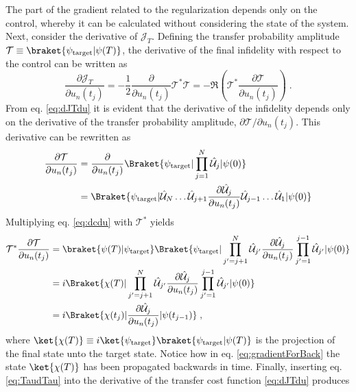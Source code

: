 The part of the gradient related to the regularization depends only on the control, whereby it can be calculated without considering the state of the system.\\ 
Next, consider the derivative of $\mathcal{J}_T$. Defining the transfer probability amplitude $\mathcal{T} \equiv \braket{\psi_{\mathrm{target}} | \psi (T)}$, the derivative of the final infidelity with respect to the control can be written as 
\begin{equation}
	\frac{\partial \mathcal{J}_T}{\partial u_n (t_j)} = - \frac{1}{2} \frac{\partial}{\partial u_n (t_j)}  \mathcal{T}^* \mathcal{T}   = - \Re \left( \mathcal{T}^* \frac{\partial \mathcal{T}}{\partial u_n (t_j)} \right) \; .
	\label{eq:dJTdu}
\end{equation}
From eq. \eqref{eq:dJTdu} it is evident that the derivative of the infidelity depends only on the derivative of the transfer probability amplitude, ${\partial \mathcal{T}}/{\partial u_n (t_j)}$. This derivative can be rewritten as
\begin{align}
	\frac{\partial \mathcal{T}}{\partial u_n (t_j)} &= \frac{\partial }{\partial u_n (t_j)} \Braket{\psi_{\mathrm{target}} | \prod_{j = 1}^{N} \hat{\mathcal{U}}_j | \psi (0)} \nonumber \\
	&= \Braket{\psi_{\mathrm{target}} | \hat{\mathcal{U}}_N \ldots \hat{\mathcal{U}}_{j+1} \frac{\partial \hat{\mathcal{U}}_{j}}{\partial u_n (t_j)} \hat{\mathcal{U}}_{j-1} \ldots \hat{\mathcal{U}}_{1} | \psi (0)}
	\label{eq:dcdu}
\end{align}
Multiplying eq. \eqref{eq:dcdu} with $\mathcal{T}^*$ yields
\begin{align}
	\mathcal{T}^* \frac{\partial \mathcal{T}}{\partial u_n (t_j)} &=  \braket{\psi(T) | \psi_{\mathrm{target}}} \Braket{\psi_{\mathrm{target}} | \prod_{j' = j +1}^{N} \hat{\mathcal{U}}_{j '} \frac{\partial \hat{\mathcal{U}}_{j}}{\partial u_n (t_j)} \prod_{j' = 1}^{ j-1} \hat{\mathcal{U}}_{j '} | \psi (0)} \\
	&= i \Braket{\chi (T) | \prod_{j' = j +1}^{N} \hat{\mathcal{U}}_{j '} \frac{\partial \hat{\mathcal{U}}_{j}}{\partial u_n (t_j)} \prod_{j' = 1}^{ j-1} \hat{\mathcal{U}}_{j '} | \psi (0)} \\
	&= i \Braket{\chi (t_j) |  \frac{\partial \hat{\mathcal{U}}_{j}}{\partial u_n (t_j)} | \psi (t_{j-1})} \; ,
	\label{eq:TaudTau}
\end{align}
where $\ket{\chi (T)} \equiv i \ket{\psi_{\mathrm{target}}} \braket{\psi_{\mathrm{target}} | \psi (T)}$ is the projection of the final state unto the target state. Notice how in eq. \eqref{eq:gradientForBack} the state $\ket{\chi (T)}$ has been propagated backwards in time. Finally, inserting eq. \eqref{eq:TaudTau} into the derivative of the transfer cost function \eqref{eq:dJTdu} produces
